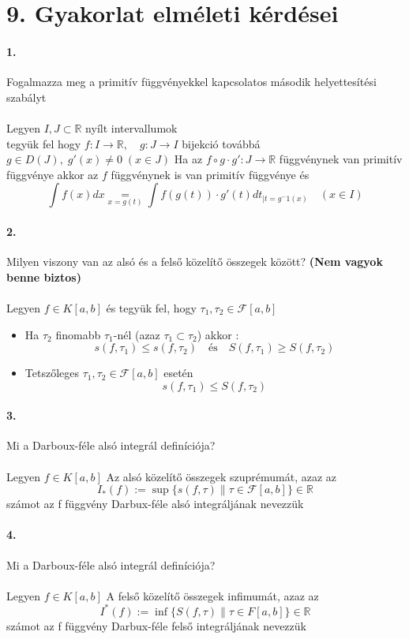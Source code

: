 \documentclass[10pt,a4paper]{article}
\newcommand{\R}{\mathbb{R}}
\renewcommand{\>}{\rightarrow}
\renewcommand{\r}{\tau}
\newcommand{\F}{\mathcal{F}}
\begin{document}
\section{9. Gyakorlat elméleti kérdései}
\paragraph{1.} Fogalmazza meg a primitív függvényekkel kapcsolatos második helyettesítési szabályt \\\\
Legyen $I,J \subset \R $ nyílt intervallumok \\
tegyük fel hogy  $f:I \rightarrow \R, \quad g: J \rightarrow I$ bijekció továbbá $g\in D(J), \; g'(x) \neq 0 \; (x\in J)$ Ha az $f \circ g \cdot g' : J \rightarrow \R $ függvénynek van primitív függvénye akkor az $f$ függvénynek is van primitív függvénye és 
\[
\int f(x)dx \underset{x=g(t)}{=} \int f(g(t)) \cdot g'(t) dt_{\big\lvert t=g^-1(x)} \quad (x\in I)
\]
\paragraph{2. } Milyen viszony van az alsó és a felső közelítő összegek között? \textbf{(Nem vagyok benne biztos)} \\\\
Legyen $f\in K[a,b]$ és tegyük fel, hogy $\tau_1 , \tau_2 \in \F[a,b]$
\begin{itemize}
\item Ha $\tau_2$ finomabb $\tau_1$-nél (azaz $\tau_1 \subset \tau_2$) akkor : 
\[
s(f,\tau_1)\leq s(f,\r_2) \quad \text{és} \quad S(f,\r_1) \geq S(f,\r_2)
\] 
\item Tetszőleges $\r_1 , \r_2 \in \F[a,b]$ esetén 
\[
s(f,\r_1) \leq S(f,\r_2)
\] 
\end{itemize} 
\paragraph{3. }
Mi a Darboux-féle alsó integrál definíciója? \\\\
Legyen $f\in K[a,b]$ Az alsó közelítő összegek szuprémumát, azaz az \[
I_* (f):= \sup \{s(f,\r ) \| \r \in \F[a,b]\} \in \R
\]	
számot az f függvény Darbux-féle alsó integráljának nevezzük
\paragraph{4. }
Mi a Darboux-féle alsó integrál definíciója? \\\\
Legyen $f\in K[a,b]$ A felső közelítő összegek infimumát, azaz az \[
I^*(f):=\inf \{S(f,\r) \| \r \in F[a,b]\} \in \R
\]	
számot az f függvény Darbux-féle felső integráljának nevezzük
\end{document}
